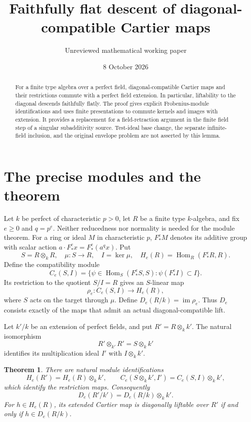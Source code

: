 \documentclass[11pt]{article}
\title{Faithfully flat descent of diagonal-compatible Cartier maps}
\author{Unreviewed mathematical working paper}
\date{8 October 2026}
\newtheorem{theorem}{Theorem}
\newcommand{\Hom}{\operatorname{Hom}}
\newcommand{\im}{\operatorname{im}}
\begin{document}
\maketitle
\begin{abstract}
For a finite type algebra over a perfect field, diagonal-compatible
Cartier maps and their restrictions commute with a perfect field
extension. In particular, liftability to the diagonal descends faithfully
flatly. The proof gives explicit Frobenius-module identifications and
uses finite presentations to commute kernels and images with extension.
It provides a replacement for a field-retraction argument in the finite
field step of a singular subadditivity source. Test-ideal base change,
the separate infinite-field inclusion, and the original envelope problem
are not asserted by this lemma.
\end{abstract}

\section{The precise modules and the theorem}
Let $k$ be perfect of characteristic $p>0$, let $R$ be a finite type
$k$-algebra, and fix $e\geq0$ and $q=p^e$. Neither reducedness nor
normality is needed for the module theorem. For a ring or ideal $M$
in characteristic $p$, $F_*^eM$ denotes its additive group with scalar
action $a\cdot F_*^ex=F_*^e(a^q x)$.
Put
\[
 S=R\otimes_k R,\quad \mu:S\longrightarrow R,\quad
 I=\ker\mu,\quad H_e(R)=\Hom_R(F_*^eR,R).
\]
Define the compatibility module
\[
 C_e(S,I)=\{\psi\in\Hom_S(F_*^eS,S):\psi(F_*^eI)\subset I\}.
\]
Its restriction to the quotient $S/I=R$ gives an $S$-linear map
\[
 \rho_e:C_e(S,I)\longrightarrow H_e(R),
\]
where $S$ acts on the target through $\mu$. Define
$D_e(R/k)=\im\rho_e$. Thus $D_e$ consists exactly of the maps
that admit an actual diagonal-compatible lift.

Let $k'/k$ be an extension of perfect fields, and put
$R'=R\otimes_k k'$. The natural isomorphism
\[
 R'\otimes_{k'}R'=S\otimes_k k'
\]
identifies its multiplication ideal $I'$ with $I\otimes_k k'$.

\begin{theorem}\label{thm:descent}
There are natural module identifications
\[
 H_e(R')=H_e(R)\otimes_k k',\qquad
 C_e(S\otimes_k k',I')=C_e(S,I)\otimes_k k',
\]
which identify the restriction maps. Consequently
\[
 D_e(R'/k')=D_e(R/k)\otimes_k k'.                         \tag{1}
\]
For $h\in H_e(R)$, its extended Cartier map is diagonally liftable
over $R'$ if and only if $h\in D_e(R/k)$.
\end{theorem}
\end{document}
